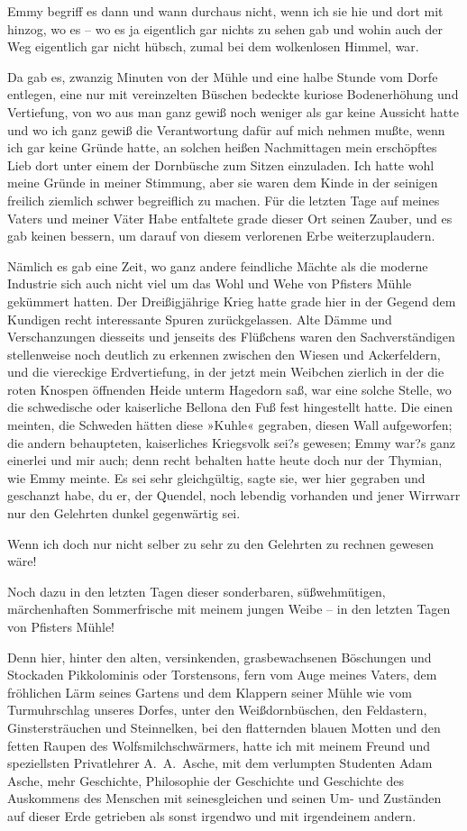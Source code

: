 Emmy begriff es dann und wann durchaus nicht, wenn ich sie hie und
dort mit hinzog, wo es – wo es ja eigentlich gar nichts zu sehen
gab und wohin auch der Weg eigentlich gar nicht hübsch, zumal bei
dem wolkenlosen Himmel, war.

Da gab es, zwanzig Minuten von der Mühle und eine halbe Stunde vom
Dorfe entlegen, eine nur mit vereinzelten Büschen bedeckte kuriose
Bodenerhöhung und Vertiefung, von wo aus man ganz gewiß noch
weniger als gar keine Aussicht hatte und wo ich ganz gewiß die
Verantwortung dafür auf mich nehmen mußte, wenn ich gar keine
Gründe hatte, an solchen heißen Nachmittagen mein erschöpftes Lieb
dort unter einem der Dornbüsche zum Sitzen einzuladen. Ich hatte
wohl meine Gründe in meiner Stimmung, aber sie waren dem Kinde in
der seinigen freilich ziemlich schwer begreiflich zu machen. Für
die letzten Tage auf meines Vaters und meiner Väter Habe entfaltete
grade dieser Ort seinen Zauber, und es gab keinen bessern, um
darauf von diesem verlorenen Erbe weiterzuplaudern.

Nämlich es gab eine Zeit, wo ganz andere feindliche Mächte als die
moderne Industrie sich auch nicht viel um das Wohl und Wehe von
Pfisters Mühle gekümmert hatten. Der Dreißigjährige Krieg hatte
grade hier in der Gegend dem Kundigen recht interessante Spuren
zurückgelassen. Alte Dämme und Verschanzungen diesseits und
jenseits des Flüßchens waren den Sachverständigen stellenweise noch
deutlich zu erkennen zwischen den Wiesen und Ackerfeldern, und die
viereckige Erdvertiefung, in der jetzt mein Weibchen zierlich in
der die roten Knospen öffnenden Heide unterm Hagedorn saß, war eine
solche Stelle, wo die schwedische oder kaiserliche Bellona den Fuß
fest hingestellt hatte. Die einen meinten, die Schweden hätten
diese »Kuhle« gegraben, diesen Wall aufgeworfen; die andern
behaupteten, kaiserliches Kriegsvolk sei?s gewesen; Emmy war?s ganz
einerlei und mir auch; denn recht behalten hatte heute doch nur der
Thymian, wie Emmy meinte. Es sei sehr gleichgültig, sagte sie, wer
hier gegraben und geschanzt habe, du er, der Quendel, noch lebendig
vorhanden und jener Wirrwarr nur den Gelehrten dunkel gegenwärtig
sei.

Wenn ich doch nur nicht selber zu sehr zu den Gelehrten zu rechnen
gewesen wäre!

Noch dazu in den letzten Tagen dieser sonderbaren, süßwehmütigen,
märchenhaften Sommerfrische mit meinem jungen Weibe – in den
letzten Tagen von Pfisters Mühle!

Denn hier, hinter den alten, versinkenden, grasbewachsenen
Böschungen und Stockaden Pikkolominis oder Torstensons, fern vom
Auge meines Vaters, dem fröhlichen Lärm seines Gartens und dem
Klappern seiner Mühle wie vom Turmuhrschlag unseres Dorfes, unter
den Weißdornbüschen, den Feldastern, Ginstersträuchen und
Steinnelken, bei den flatternden blauen Motten und den fetten
Raupen des Wolfsmilchschwärmers, hatte ich mit meinem Freund und
speziellsten Privatlehrer A.~A.~Asche, mit dem verlumpten Studenten
Adam Asche, mehr Geschichte, Philosophie der Geschichte und
Geschichte des Auskommens des Menschen mit seinesgleichen und
seinen Um- und Zuständen auf dieser Erde getrieben als sonst
irgendwo und mit irgendeinem andern.

